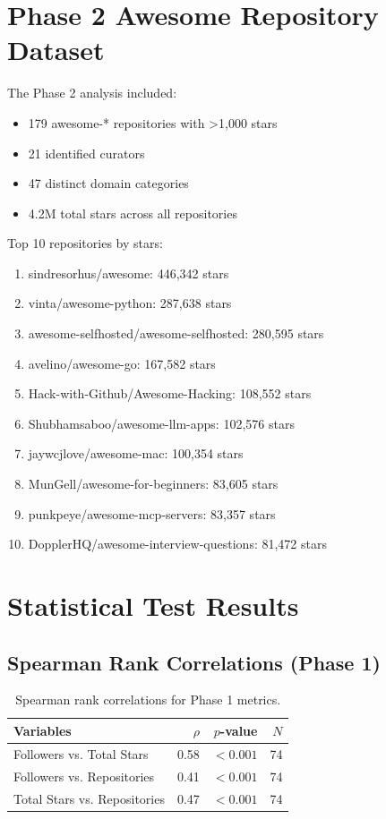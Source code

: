 \documentclass[11pt]{article}
\begin{document}
\section{Phase 2 Awesome Repository Dataset}

The Phase 2 analysis included:
\begin{itemize}
    \item 179 awesome-* repositories with >1,000 stars
    \item 21 identified curators
    \item 47 distinct domain categories
    \item 4.2M total stars across all repositories
\end{itemize}

Top 10 repositories by stars:
\begin{enumerate}
    \item sindresorhus/awesome: 446,342 stars
    \item vinta/awesome-python: 287,638 stars
    \item awesome-selfhosted/awesome-selfhosted: 280,595 stars
    \item avelino/awesome-go: 167,582 stars
    \item Hack-with-Github/Awesome-Hacking: 108,552 stars
    \item Shubhamsaboo/awesome-llm-apps: 102,576 stars
    \item jaywcjlove/awesome-mac: 100,354 stars
    \item MunGell/awesome-for-beginners: 83,605 stars
    \item punkpeye/awesome-mcp-servers: 83,357 stars
    \item DopplerHQ/awesome-interview-questions: 81,472 stars
\end{enumerate}

\section{Statistical Test Results}

\subsection{Spearman Rank Correlations (Phase 1)}

\begin{table}[H]
    \centering
    \begin{tabular}{lrrr}
        \toprule
        \textbf{Variables} & $\rho$ & $p$-value & $N$ \\
        \midrule
        Followers vs. Total Stars & 0.58 & $<0.001$ & 74 \\
        Followers vs. Repositories & 0.41 & $<0.001$ & 74 \\
        Total Stars vs. Repositories & 0.47 & $<0.001$ & 74 \\
        \bottomrule
    \end{tabular}
    \caption{Spearman rank correlations for Phase 1 metrics.}
\end{table}
\end{document}
